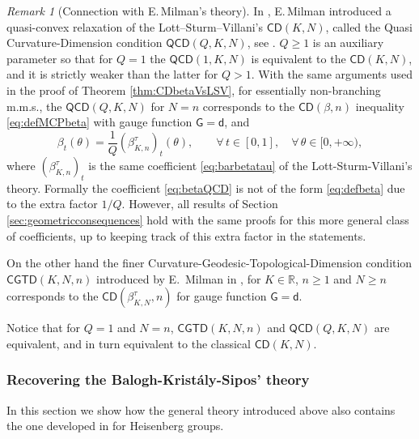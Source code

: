 \documentclass[11pt,a4paper]{article}
\theoremstyle{plain}
\theoremstyle{definition}
\theoremstyle{remark}
\newtheorem{remark}[theorem]{Remark}
\numberwithin{equation}{section}
\newcommand{\R}{\mathbb{R}} %
\newcommand{\CD}{\mathsf{CD}}
\newcommand{\QCD}{\mathsf{QCD}}
\newcommand{\sfd}{\mathsf d}
\newcommand{\sfG}{\mathsf G}
\begin{document}
\begin{remark}[Connection with  E.\,Milman's theory]\label{rem:Milman}
In \cite{MilmanSR}, E.\,Milman introduced a quasi-convex relaxation of the Lott–Sturm–Villani's $\CD(K,N)$, called the Quasi Cur\-va\-ture-Di\-men\-sion condition $\QCD(Q,K,N)$, see \cite[Def.\@ 2.3]{MilmanSR}. $Q\geq 1$ is an auxiliary parameter so that for $Q=1$ the $\QCD(1,K,N)$ is equivalent to the $\CD(K,N)$, and it is strictly weaker than the latter for $Q>1$. With the same arguments used in the proof of Theorem \ref{thm:CDbetaVsLSV}, for essentially non-branching m.m.s., the $\QCD(Q,K,N)$ for $N=n$ corresponds to the $\CD(\beta,n)$ inequality \eqref{eq:defMCPbeta} with gauge function $\sfG=\sfd$, and
\begin{equation}\label{eq:betaQCD}
\beta_t(\theta) = \frac{1}{Q}(\beta^{\tau}_{K,n})_t(\theta), \qquad \forall\, t\in [0,1],\quad \forall\, \theta \in [0,+\infty),
\end{equation}
where $(\beta^{\tau}_{K,n})_t$ is the same coefficient \eqref{eq:barbetatau} of the Lott-Sturm-Villani's theory. Formally the coefficient \eqref{eq:betaQCD} is not of the form \eqref{eq:defbeta} due to the extra factor $1/Q$. However, all results of Section \ref{sec:geometricconsequences} hold with the same proofs for this more general class of coefficients, up to keeping track of this extra factor in the statements.

On the other hand the finer Curvature-Geodesic-Topological-Dimension condition $\mathsf{CGTD}(K,N,n)$ introduced by E.\, Milman in \cite[Sec.\@ 7]{MilmanSR}, for $K\in \R$, $n\geq 1$ and $N\geq n$ corresponds to the $\CD(\beta_{K,N}^\tau,n)$ for gauge function $\sfG=\sfd$. 

Notice that for $Q=1$ and $N=n$, $\mathsf{CGTD}(K,N,n)$ and $\QCD(Q,K,N)$ are equivalent, and in turn equivalent to the classical $\CD(K,N)$.
\end{remark}



\subsubsection{Recovering the Balogh-Kristály-Sipos' theory}\label{sec:howtorecover2}

In this section we show how the general theory introduced above also contains the one developed in \cite{BKS} for Heisenberg groups.
\end{document}
